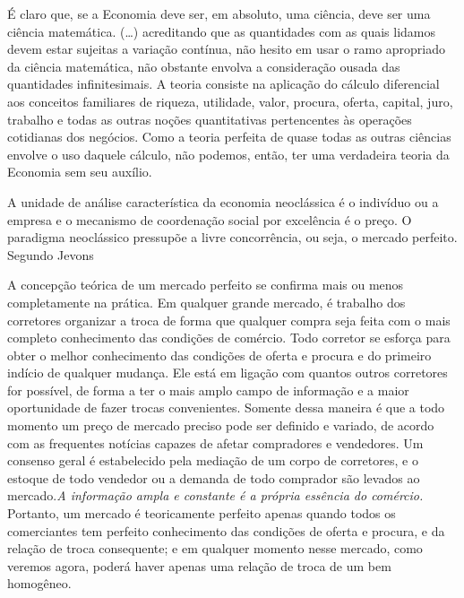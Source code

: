 \documentclass[a4paper, 12pt, openright, oneside, german, french, english, brazil]{abntex2}
\begin{document}
	\begin{citacao}
		É claro que, se a Economia deve ser, em absoluto, uma ciência, deve ser uma ciência matemática. (\ldots) acreditando que as quantidades com as quais lidamos devem estar sujeitas a variação contínua, não hesito em usar o ramo apropriado da ciência matemática, não obstante envolva a consideração ousada das quantidades infinitesimais. A teoria consiste na aplicação do cálculo diferencial aos conceitos familiares de riqueza, utilidade, valor, procura, oferta, capital, juro, trabalho e todas as outras noções quantitativas pertencentes às operações cotidianas dos negócios. Como a teoria perfeita de quase todas as outras ciências envolve o uso daquele cálculo, não podemos, então, ter uma verdadeira teoria da Economia sem seu auxílio. \cite[p. 48]{jevons1996teoria}
	\end{citacao}
	
	A unidade de análise característica da economia neoclássica é o indivíduo ou a empresa e o mecanismo de coordenação social por excelência é o preço. O paradigma neoclássico pressupõe a livre concorrência, ou seja, o mercado perfeito. Segundo Jevons
	
	\begin{citacao}
		A concepção teórica de um mercado perfeito se confirma mais ou menos completamente na prática. Em qualquer grande mercado, é trabalho dos corretores organizar a troca de forma que qualquer compra seja feita com o mais completo conhecimento das condições de comércio. Todo corretor se esforça para obter o melhor conhecimento das condições de oferta e procura e do primeiro indício de qualquer mudança. Ele está em ligação com quantos outros corretores for possível, de forma a ter o mais amplo campo de informação e a maior oportunidade de fazer trocas convenientes. Somente dessa maneira é que a todo momento um preço de mercado preciso pode ser definido e variado, de acordo com as frequentes notícias capazes de afetar compradores e vendedores. Um consenso geral é estabelecido pela mediação de um corpo de corretores, e o estoque de todo vendedor ou a demanda de todo comprador são levados ao mercado.\textit{A informação ampla e constante é a própria essência do comércio.} Portanto, um mercado é teoricamente perfeito apenas quando todos os comerciantes tem perfeito conhecimento das condições de oferta e procura, e da relação de troca consequente; e em qualquer momento nesse mercado, como veremos agora, poderá haver apenas uma relação de troca de um bem homogêneo. \cite[p. 98, grifo meu]{jevons1996teoria}
	\end{citacao}
	
\end{document}

